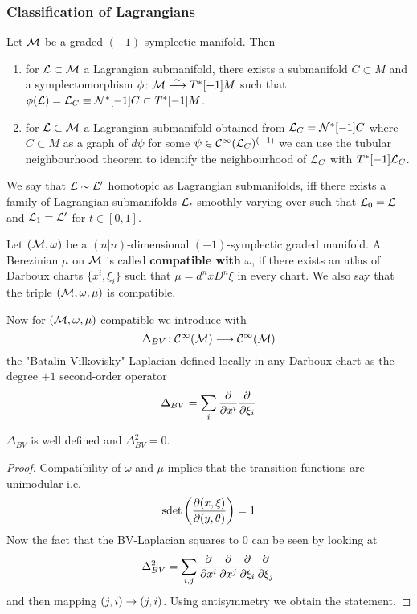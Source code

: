 \subsubsection{Classification of Lagrangians}

Let $\mathcal{M}$ be a graded $(-1)$-symplectic manifold. Then
\begin{enumerate}
  \item for $\mathcal{L} \subset \mathcal{M}$ a Lagrangian submanifold, there exists a submanifold $C \subset M$ and a symplectomorphism $\phi \colon \MM \atob{\sim} T^*[-1]M$ such that $\phi(\LL) = \LL_C \equiv \NC^*[-1] C \subset T^*[-1]M$.

  \item for $\mathcal{L} \subset \mathcal{M}$ a Lagrangian submanifold obtained from $\mathcal{L}_C = \mathcal{N}^*[-1] C$ where $C \subset M$ as a graph of $d\psi$ for some $\psi \in \mathcal{C}^{\infty}(\mathcal{L}_C)^{(-1)}$ we can use the tubular neighbourhood theorem to identify the neighbourhood of $\mathcal{L}_C$ with $T^*[-1]\mathcal{L}_C$.
\end{enumerate}

We say that $\mathcal{L} \sim \mathcal{L}^\prime$ homotopic as Lagrangian submanifolds, iff there exists a family of Lagrangian submanifolds $\mathcal{L}_t$ smoothly varying over  such that $\mathcal{L}_0 = \mathcal{L}$ and $\mathcal{L}_1 = \mathcal{L}^\prime$ for $t \in [0,1]$.

\begin{definition}
  Let $(\mathcal{M}, \omega)$ be a $(n|n)$-dimensional $(-1)$-symplectic graded manifold. A Berezinian $\mu$ on $\mathcal{M}$ is called \textbf{compatible with} $\omega$, if there exists an atlas of Darboux charts $\{ x^i, \xi_i\}$ such that $\mu = d^nx D^n \xi$ in every chart. We also say that the triple $(\mathcal{M}, \omega, \mu)$ is compatible.
\end{definition}

Now for $(\mathcal{M}, \omega, \mu)$ compatible we introduce with
\begin{equation}
  \Delta_{BV} \colon \mathcal{C}^{\infty}(\mathcal{M}) \longrightarrow \mathcal{C}^{\infty}(\mathcal{M})
\end{equation}
the "Batalin-Vilkovisky" Laplacian defined locally in any Darboux chart as the degree $+1$ second-order operator
\begin{equation}
  \Delta_{BV} = \sum_i \frac{\partial }{\partial x^i} \frac{\partial }{\partial \xi_i}
\end{equation}

\begin{lem}
  $\Delta_{BV}$ is well defined and $\Delta_{BV}^2 = 0$.
\begin{proof}
  Compatibility of $\omega$ and $\mu$ implies that the transition functions are unimodular i.e.
  $$ \operatorname{sdet}\left( \frac{\partial (x, \xi)}{\partial (y, \theta)} \right) = 1 $$
  Now the fact that the BV-Laplacian squares to $0$ can be seen by looking at
  \begin{equation}
    \Delta_{BV}^2 = \sum_{i,j} \frac{\partial }{\partial x^i} \frac{\partial }{\partial x^j} \frac{\partial }{\partial \xi_i} \frac{\partial }{\partial \xi_j}
  \end{equation}
  and then mapping $(j,i) \rightarrow (j,i)$. Using antisymmetry we obtain the statement.
\end{proof}
\end{lem}

